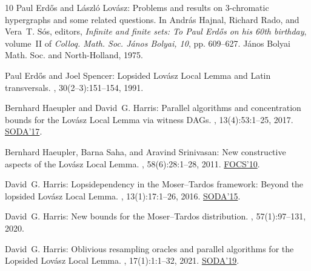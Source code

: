 \documentclass[11pt]{article}
\begin{document}
\begin{thebibliography}{10}
{\sc Paul Erd{\H{o}}s and L\'{a}szl\'{o} Lov{\'a}sz}: Problems and results on
  {$3$}-chromatic hypergraphs and some related questions.
\newblock In {\sc Andr\'as Hajnal, Richard Rado, and Vera~T. S\'os}, editors,
  {\em Infinite and finite sets: {T}o Paul Erd\H{o}s on his 60th birthday},
  volume~II of {\em Colloq. Math. Soc. J\'anos Bolyai, 10}, pp. 609--627.
  J\'anos Bolyai Math. Soc. and North-Holland, 1975.

{\sc Paul Erd{\H{o}}s and Joel Spencer}: Lopsided {L}ov{\'a}sz {L}ocal {L}emma
  and {L}atin transversals.
, 30(2--3):151--154, 1991.
\newblock [\epfmtdoi{10.1016/0166-218X(91)90040-4}]

{\sc Bernhard Haeupler and David~G. Harris}: Parallel algorithms and
  concentration bounds for the {L}ov{\'a}sz {L}ocal {L}emma via witness {DAG}s.
, 13(4):53:1--25, 2017.
\newblock \prelim \href{https://doi.org/10.1137/1.9781611974782.76}{SODA'17}.
\newblock [\epfmtdoi{10.1145/3147211}]

{\sc Bernhard Haeupler, Barna Saha, and Aravind Srinivasan}: New constructive
  aspects of the {L}ov\'{a}sz {L}ocal {L}emma.
, 58(6):28:1--28, 2011.
\newblock \prelim \href{https://doi.org/10.1109/FOCS.2010.45}{FOCS'10}.
\newblock [\epfmtdoi{10.1145/2049697.2049702}]

{\sc David~G. Harris}: Lopsidependency in the {M}oser--{T}ardos framework:
  {B}eyond the lopsided {L}ov{\'{a}}sz {L}ocal {L}emma.
, 13(1):17:1--26, 2016.
\newblock \prelim \href{https://doi.org/10.1137/1.9781611973730.120}{SODA'15}.
\newblock [\epfmtdoi{10.1145/3015762}]

{\sc David~G. Harris}: New bounds for the {M}oser--{T}ardos distribution.
, 57(1):97--131, 2020.

{\sc David~G. Harris}: Oblivious resampling oracles and parallel algorithms for
  the {L}opsided {L}ov{\'a}sz {L}ocal {L}emma.
, 17(1):1:1--32, 2021.
\newblock \prelim \href{https://doi.org/10.1137/1.9781611975482.52}{SODA'19}.
\newblock [\epfmtdoi{10.1145/3392035}]


\end{thebibliography}
\end{document}
